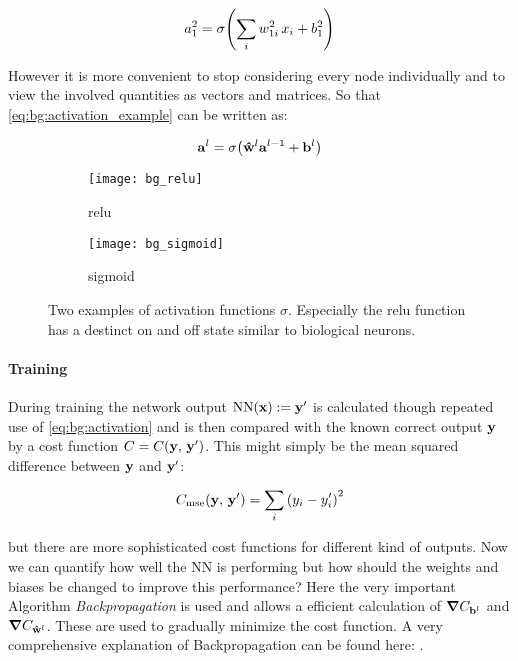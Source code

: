 \begin{equation} \label{eq:bg:activation_example}
    a^2_1 = \sigma \qty(\sum_i w^2_{1i} \, x_i + b^2_1)
\end{equation}

\noindent
However it is more convenient to stop considering every node individually and to view the involved quantities as vectors and matrices. So that \eqref{eq:bg:activation_example} can be written as:

\begin{equation} \label{eq:bg:activation}
    \vb{a}^l = \sigma \qty(\vu{w}^l \vb{a}^{l-1} + \vb{b}^l)
\end{equation}

\begin{figure}[H]
\centering
\begin{subfigure}{.5\textwidth}
    \centering
    \texttt{[image: bg\_relu]}
    \caption{relu}
    \label{}
\end{subfigure}%
\begin{subfigure}{.5\textwidth}
    \centering
    \texttt{[image: bg\_sigmoid]}
    \caption{sigmoid}
    \label{}
\end{subfigure}
\caption{Two examples of activation functions $\sigma$. Especially the relu function has a destinct on and off state similar to biological neurons.}
\label{}
\end{figure}

\paragraph{Training}
During training the network output $\mathrm{NN}(\vb x) := \vb{y}' $ is calculated though repeated use of \eqref{eq:bg:activation} and is then compared with the known correct output $\vb y$ by a cost function $C = C(\vb y, \, \vb y')$. This might simply be the mean squared difference between $\vb y$ and $\vb y'$:

\begin{equation}
    C_{\mathrm{mse}}(\vb y, \, \vb y') = \sum_i \qty(y_i - y_i')^2
\end{equation}

\noindent
but there are more sophisticated cost functions for different kind of outputs. Now we can quantify how well the NN is performing but how should the weights and biases be changed to improve this performance?
Here the very important Algorithm \textit{Backpropagation} is used and allows a efficient calculation of $\grad{C}_{\vb{b}^l}$ and $\grad{C}_{\vu{w}^l}$. These are used to gradually minimize the cost function. A very comprehensive explanation of Backpropagation can be found here: \cite{backprop}.


